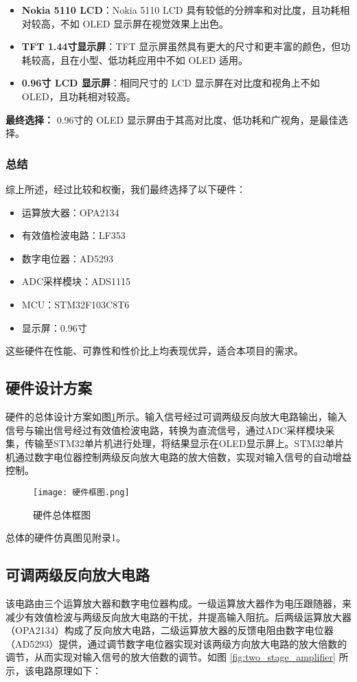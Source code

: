 \documentclass[lang=cn,11pt,a4paper]{elegantpaper}
\begin{document}
\begin{itemize}
  \item \textbf{Nokia 5110 LCD}：Nokia 5110 LCD 具有较低的分辨率和对比度，且功耗相对较高，不如 OLED 显示屏在视觉效果上出色。
  \item \textbf{TFT 1.44寸显示屏}：TFT 显示屏虽然具有更大的尺寸和更丰富的颜色，但功耗较高，且在小型、低功耗应用中不如 OLED 适用。
  \item \textbf{0.96寸 LCD 显示屏}：相同尺寸的 LCD 显示屏在对比度和视角上不如 OLED，且功耗相对较高。
\end{itemize}

\textbf{最终选择：} 0.96寸的 OLED 显示屏由于其高对比度、低功耗和广视角，是最佳选择。

\subsubsection{总结}

综上所述，经过比较和权衡，我们最终选择了以下硬件：
\begin{itemize}
  \item 运算放大器：OPA2134
  \item 有效值检波电路：LF353
  \item 数字电位器：AD5293
  \item ADC采样模块：ADS1115
  \item MCU：STM32F103C8T6
  \item 显示屏：0.96寸
\end{itemize}

这些硬件在性能、可靠性和性价比上均表现优异，适合本项目的需求。

\subsection{硬件设计方案}
硬件的总体设计方案如图\ref{fig:hardware_picture}所示。输入信号经过可调两级反向放大电路输出，输入信号与输出信号经过有效值检波电路，转换为直流信号，通过ADC采样模块采集，传输至STM32单片机进行处理，将结果显示在OLED显示屏上。STM32单片机通过数字电位器控制两级反向放大电路的放大倍数，实现对输入信号的自动增益控制。

\begin{figure}[!htb]
  \centering
  \texttt{[image: 硬件框图.png]}
  \caption{硬件总体框图}
  \label{fig:hardware_picture}
\end{figure}
总体的硬件仿真图见附录1。

\subsection{可调两级反向放大电路}
该电路由三个运算放大器和数字电位器构成。一级运算放大器作为电压跟随器，来减少有效值检波与两级反向放大电路的干扰，并提高输入阻抗。后两级运算放大器（OPA2134）构成了反向放大电路，二级运算放大器的反馈电阻由数字电位器（AD5293）提供，通过调节数字电位器实现对该两级方向放大电路的放大倍数的调节，从而实现对输入信号的放大倍数的调节。如图 \ref{fig:two_stage_amplifier} 所示，该电路原理如下：
\end{document}
